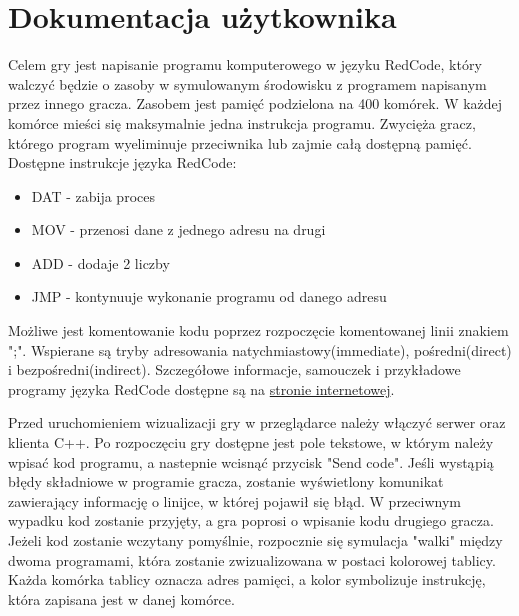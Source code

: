 \chapter{Dokumentacja użytkownika}
Celem gry jest napisanie programu komputerowego w języku RedCode, który walczyć będzie o zasoby w symulowanym środowisku z programem napisanym przez innego gracza. Zasobem jest pamięć podzielona na 400 komórek. W każdej komórce mieści się maksymalnie jedna instrukcja programu. Zwycięża gracz, którego program wyeliminuje przeciwnika lub zajmie całą dostępną pamięć.
Dostępne instrukcje języka RedCode:
\begin{itemize}
\item DAT - zabija proces
\item MOV - przenosi dane z jednego adresu na drugi
\item ADD - dodaje 2 liczby
\item JMP - kontynuuje wykonanie programu od danego adresu
\end{itemize}
Możliwe jest komentowanie kodu poprzez rozpoczęcie komentowanej linii znakiem ";".
Wspierane są tryby adresowania natychmiastowy(immediate), pośredni(direct) i bezpośredni(indirect). Szczegółowe informacje, samouczek i przykładowe programy języka RedCode dostępne są na \href{http://vyznev.net/corewar/guide.html}{stronie internetowej}.

Przed uruchomieniem wizualizacji gry w przeglądarce należy włączyć serwer oraz klienta C++. Po rozpoczęciu gry dostępne jest pole tekstowe, w którym należy wpisać kod programu, a nastepnie wcisnąć przycisk "Send code". Jeśli wystąpią błędy składniowe w programie gracza, zostanie wyświetlony komunikat zawierający informację o linijce, w której pojawił się błąd. W przeciwnym wypadku kod zostanie przyjęty, a gra poprosi o wpisanie kodu drugiego gracza. Jeżeli kod zostanie wczytany pomyślnie, rozpocznie się symulacja "walki" między dwoma programami, która zostanie zwizualizowana w postaci kolorowej tablicy. Każda komórka tablicy oznacza adres pamięci, a kolor symbolizuje instrukcję, która zapisana jest w danej komórce.